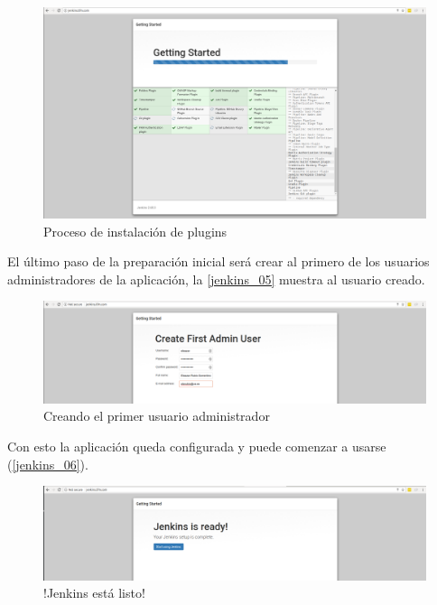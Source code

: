 \begin{figure}[htbp]
	\centering
	\includegraphics[width=1.0\linewidth]
	{desarrollo/figuras/jenkins_04.png}
	\caption{Proceso de instalación de plugins}
	\label{jenkins_04}
\end{figure}

El último paso de la preparación inicial será crear al primero de los usuarios administradores de la aplicación, la \autoref{jenkins_05} muestra al usuario creado.

\begin{figure}[htbp]
	\centering
	\includegraphics[width=1.0\linewidth]
	{desarrollo/figuras/jenkins_05.png}
	\caption{Creando el primer usuario administrador}
	\label{jenkins_05}
\end{figure}

Con esto la aplicación queda configurada y puede comenzar a usarse (\autoref{jenkins_06}).

\begin{figure}[htbp]
	\centering
	\includegraphics[width=1.0\linewidth]
	{desarrollo/figuras/jenkins_06.png}
	\caption{!Jenkins está listo!}
	\label{jenkins_06}
\end{figure}

